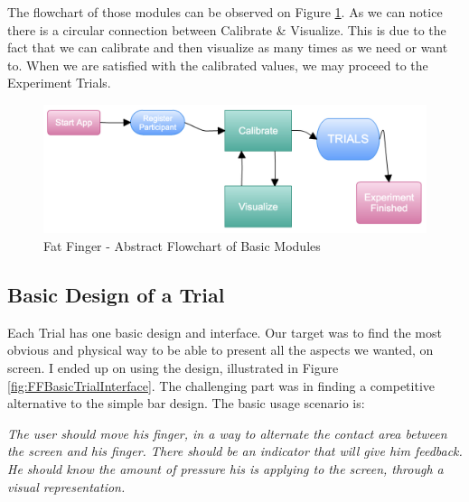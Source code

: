  The flowchart of those modules can be observed on Figure \ref{fig:FFBasicFlow}. As we can notice there is a circular connection between Calibrate \& Visualize. This is due to the fact that we can calibrate and then visualize as many times as we need or want to. When we are satisfied with the calibrated values, we may proceed to the Experiment Trials. 

 \begin{figure}[H]
\centering
\includegraphics[width=\textwidth]{figures/FFBasicFlow.png}
\caption{Fat Finger - Abstract Flowchart of Basic Modules}
\label{fig:FFBasicFlow}
\end{figure}


\subsection{Basic Design of a Trial}
Each Trial has one basic design and interface. Our target was to find the most obvious and physical way to be able to present all the aspects we wanted, on screen. I ended up on using the design, illustrated in Figure \ref{fig:FFBasicTrialInterface}. The challenging part was in finding a competitive alternative to the simple bar design. The basic usage scenario is:

\emph{The user should move his finger, in a way to alternate the contact area between the screen and his finger. There should be an indicator that will give him feedback. He should know the amount of pressure his is applying to the screen, through a visual representation.}



